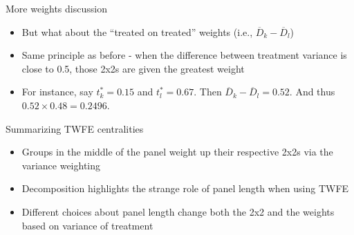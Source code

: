 \documentclass{beamer}
\begin{document}
\begin{frame}{More weights discussion}

\begin{itemize}
\item But what about the ``treated on treated'' weights (i.e., $\overline{D}_k - \overline{D}_{l} $)  
\item Same principle as before - when the difference between treatment variance is close to 0.5, those 2x2s are given the greatest weight
\item For instance, say $t^*_k=0.15$ and $t^*_l=0.67$. Then $\overline{D}_k - \overline{D}_{l} = 0.52$.  And thus $0.52 \times 0.48 = 0.2496$.
\end{itemize}

\end{frame}


\begin{frame}{Summarizing TWFE centralities}

\begin{itemize}
\item Groups in the middle of the panel weight up their respective 2x2s via the variance weighting
\item Decomposition highlights the strange role of panel length when using TWFE
\item Different choices about panel length change both the 2x2 and the weights based on variance of treatment
\end{itemize}

\end{frame}



\end{document}
